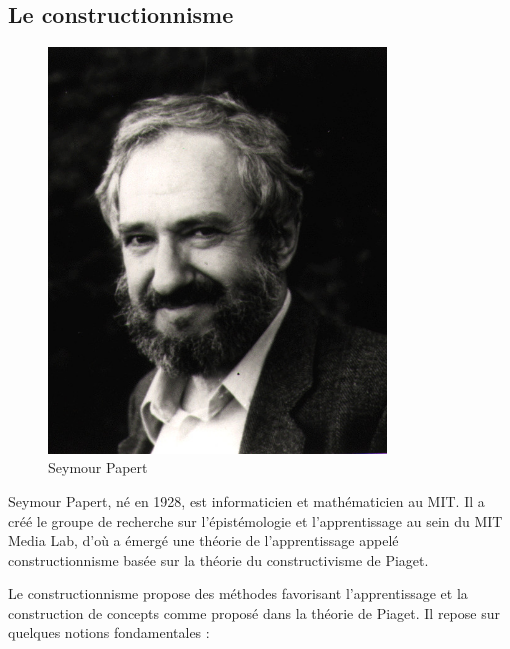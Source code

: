 \subsection{Le constructionnisme}
\begin{minipage}[H]{0.3\linewidth}
  \begin{figure}[H]
  \centering
  \includegraphics[width=0.8\textwidth]{../resources/illustrations/papert}
  \caption{Seymour Papert}
  \end{figure}
\end{minipage}
\begin{minipage}[H]{0.7\linewidth}
Seymour Papert, né en 1928, est informaticien et mathématicien au MIT. Il a créé le groupe de recherche sur l'épistémologie et l'apprentissage au sein du MIT Media Lab, d'où a émergé une théorie de l'apprentissage appelé constructionnisme basée sur la théorie du constructivisme de Piaget.
\vspace{1cm}
\end{minipage}

Le constructionnisme propose des méthodes favorisant l'apprentissage et la construction de concepts comme proposé dans la théorie de Piaget. Il repose sur quelques notions fondamentales :

